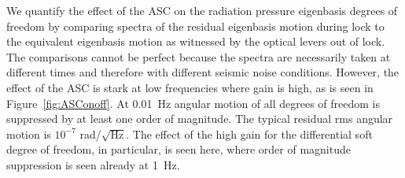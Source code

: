 We quantify the effect of the ASC on the radiation pressure eigenbasis
degrees of freedom by comparing spectra of the residual eigenbasis
motion during lock to the equivalent eigenbasis motion as witnessed by
the optical levers out of lock. The comparisons cannot be perfect
because the spectra are necessarily taken at different times and
therefore with different seismic noise conditions. However, the effect
of the ASC is stark at low frequencies where gain is high, as is seen
in Figure~\ref{fig:ASConoff}. At 0.01~Hz angular motion of all degrees
of freedom is suppressed by at least one order of magnitude. The
typical residual rms angular motion is $10^{-7}$
rad/$\sqrt{\mathrm{Hz}}$. The effect of the high gain for the
differential soft degree of freedom, in particular, is seen here,
where order of magnitude suppression is seen already at 1~Hz.

